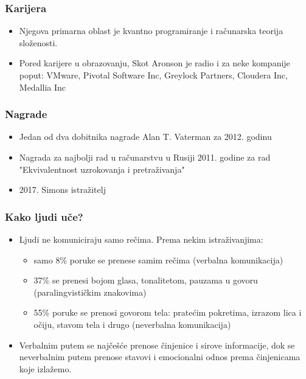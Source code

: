 \documentclass{beamer}
\begin{document}
\begin{frame}[fragile]\frametitle{Karijera}
	\begin{itemize}	
		\item Njegova primarna oblast je kvantno programiranje i računarska teorija složenosti.
		\item Pored karijere u obrazovanju, Skot Aronson je radio i za neke kompanije poput: VMware, Pivotal Software Inc, Greylock Partners, Cloudera Inc, Medallia Inc
	\end{itemize}
\end{frame}

\begin{frame}[fragile]\frametitle{Nagrade}
	\begin{itemize}	
		\item Jedan od dva dobitnika nagrade Alan T. Vaterman za 2012. godinu
		\item Nagrada za najbolji rad u računarstvu u Rusiji 2011. godine za rad "Ekvivalentnost uzrokovanja i pretraživanja"
		\item 2017. Simons istražitelj
	\end{itemize}
\end{frame}

\begin{frame}[fragile]\frametitle{Kako ljudi uče?}
	\begin{itemize}	
		\item Ljudi ne komuniciraju samo rečima. Prema nekim
		istraživanjima:
		\begin{itemize}
			\item samo 8\% poruke se prenese samim rečima (verbalna komunikacija)
			\item 37\% se prenesi bojom glasa, tonalitetom, pauzama u govoru (paralingvističkim znakovima)
			\item 55\% poruke se prenosi govorom tela: pratećim pokretima, izrazom lica i
			očiju, stavom tela i drugo (neverbalna komunikacija)
		\end{itemize}
		\item Verbalnim putem se najčešće prenose činjenice i
		sirove informacije, dok se neverbalnim putem prenose stavovi i
		emocionalni odnos prema činjenicama koje izlažemo.
	\end{itemize}
\end{frame}
\end{document}
